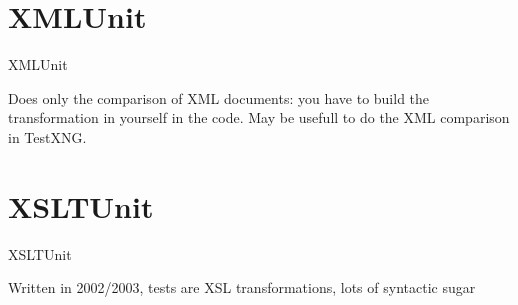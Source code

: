 \section{XMLUnit}

XMLUnit

Does only the comparison of XML documents: you have to build the transformation in yourself in the code.
May be usefull to do the XML comparison in TestXNG.

\section{XSLTUnit}

XSLTUnit

Written in 2002/2003, tests are XSL transformations, lots of syntactic sugar